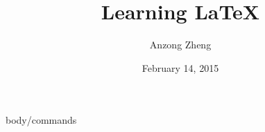 \documentclass[10pt,a4paper]{book}
\begin{document}
\begin{CJK*}{UTF8}{song}
	\author{Anzong Zheng}
	\title{Learning \LaTeX}
	\date{February 14, 2015}
	\maketitle
	\newpage
	
	
	\tableofcontents
	\newpage
	
%	
%	
%	
%	
%	
%	
%	
%	
%
%	
	
%	
%	
%	
%	
	 {body/commands}

\end{CJK*}
\end{document}
